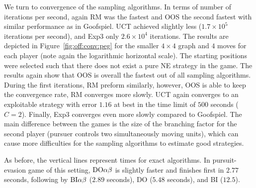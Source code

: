 We turn to convergence of the sampling algorithms.
In terms of number of iterations per second, again RM was the fastest and OOS the second fastest with similar performance as in Goofspiel.
UCT achieved slightly less ($1.7\times10^5$ iterations per second), and Exp3 only $2.6\times10^4$ iterations.
The results are depicted in Figure~\ref{fig:off:conv:peg} for the smaller $4\times4$ graph and $4$ moves for each player (note again the logarithmic horizontal scale).
The starting positions were selected such that there does not exist a pure NE strategy in the game.
The results again show that OOS is overall the fastest out of all sampling algorithms.
During the first iterations, RM preform similarly, however, OOS is able to keep the convergence rate, RM converges more slowly.
UCT again converges to an exploitable strategy with error $1.16$ at best in the time limit of $500$ seconds ($C=2$).
Finally, Exp3 converges even more slowly compared to Goofspiel.
The main difference between the games is the size of the branching factor for the second player (pursuer controls two simultaneously moving units), which can cause more difficulties for the sampling algorithms to estimate good strategies.

As before, the vertical lines represent times for exact algorithms.
In pursuit-evasion game of this setting, $\textrm{DO}\alpha\beta$ is slightly faster and finishes first in $2.77$ seconds, following by $\textrm{BI}\alpha\beta$ ($2.89$ seconds), \textsc{DO} ($5.48$ seconds), and \textsc{BI} ($12.5$).

